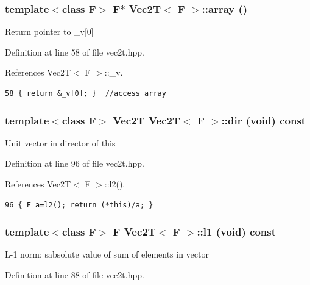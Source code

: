 \subsubsection{\setlength{\rightskip}{0pt plus 5cm}template$<$class F$>$ F$\ast$ {\bf Vec2T}$<$ F $>$::array ()\hspace{0.3cm}{\tt  [inline]}}\label{classVec2T_fed1d2aa4ab9cd28dd771492a3bc2f97_fed1d2aa4ab9cd28dd771492a3bc2f97}


Return pointer to \_\-v[0] 

Definition at line 58 of file vec2t.hpp.

References Vec2T$<$ F $>$::\_\-v.

\footnotesize\begin{verbatim}58 { return &_v[0]; }  //access array
\end{verbatim}\normalsize 


\subsubsection{\setlength{\rightskip}{0pt plus 5cm}template$<$class F$>$ {\bf Vec2T} {\bf Vec2T}$<$ F $>$::dir (void) const\hspace{0.3cm}{\tt  [inline]}}\label{classVec2T_a74553621910e03016573bb3cd7a3e7c_a74553621910e03016573bb3cd7a3e7c}


Unit vector in director of this 

Definition at line 96 of file vec2t.hpp.

References Vec2T$<$ F $>$::l2().

\footnotesize\begin{verbatim}96 { F a=l2(); return (*this)/a; }
\end{verbatim}\normalsize 


\subsubsection{\setlength{\rightskip}{0pt plus 5cm}template$<$class F$>$ F {\bf Vec2T}$<$ F $>$::l1 (void) const\hspace{0.3cm}{\tt  [inline]}}\label{classVec2T_d6b8e40dbcfd9fe5c2375fe82598b02d_d6b8e40dbcfd9fe5c2375fe82598b02d}


L-1 norm: sabsolute value of sum of elements in vector 

Definition at line 88 of file vec2t.hpp.

